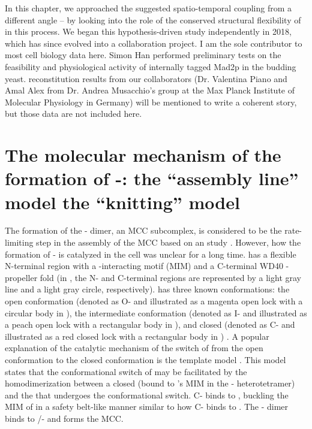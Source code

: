 In this chapter, we approached the suggested spatio-temporal coupling from a different angle -- by looking into the role of the conserved structural flexibility of  in this process. We began this hypothesis-driven study independently in 2018, which has since evolved into a collaboration project. I am the sole contributor to most cell biology data here. Simon Han performed preliminary tests on the feasibility and physiological activity of internally tagged Mad2p in the budding yeast.  reconstitution results from our collaborators (Dr. Valentina Piano and Amal Alex from Dr. Andrea Musacchio's group at the Max Planck Institute of Molecular Physiology in Germany) will be mentioned to write a coherent story, but those data are not included here.

\section{The molecular mechanism of the formation of -: the ``assembly line'' model  the ``knitting'' model}
\label{TwoModels}

The formation of the - dimer, an MCC subcomplex, is considered to be the rate-limiting step in the assembly of the MCC based on an  study \cite{Faesen2017}. However, how the formation of - is catalyzed in the cell was unclear for a long time.  has a flexible N-terminal region with a -interacting motif (MIM) and a C-terminal WD40 \textbeta{}-propeller fold \cite{CDC20-KEN} (in , the N- and C-terminal regions are represented by a light gray line and a light gray circle, respectively).  has three known conformations: the open conformation (denoted as O- and illustrated as a magenta open lock with a circular body in ), the intermediate conformation (denoted as I- and illustrated as a peach open lock with a rectangular body in ), and closed (denoted as C- and illustrated as a red closed lock with a rectangular body in ) \cite{I-MAD2}. A popular explanation of the catalytic mechanism of the switch of  from the open conformation to the closed conformation is the template model \cite{TemplateModel}. This model states that the conformational switch of  may be facilitated by the homodimerization between a closed  (bound to 's MIM in the - heterotetramer) and the  that undergoes the conformational switch. C- binds to , buckling the MIM of  in a safety belt-like manner similar to how C- binds to  \cite{Structure1GO4, SpMCC}. The - dimer binds to /- and forms the MCC.

